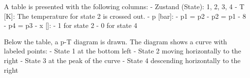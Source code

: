 A table is presented with the following columns:  
- Zustand (State): 1, 2, 3, 4  
- T [K]: The temperature for state 2 is crossed out.  
- p [bar]:  
  - p1 = p2  
  - p2 = p1  
  - 8  
  - p4 = p3  
- x []:  
  - 1 for state 2  
  - 0 for state 4  

Below the table, a p-T diagram is drawn. The diagram shows a curve with labeled points:  
- State 1 at the bottom left  
- State 2 moving horizontally to the right  
- State 3 at the peak of the curve  
- State 4 descending horizontally to the right